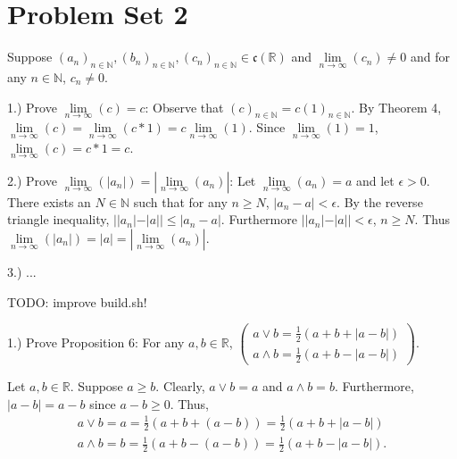 \documentclass{book}
\newcommand{\setbackgroundcolour}{\pagecolor[rgb]{0.2,0.2,0.2}}
\newcommand{\settextcolour}{\color[rgb]{0.8,0.8,0.8}}
\newcommand{\invertbackgroundtext}{\setbackgroundcolour\settextcolour}
\begin{document}
\invertbackgroundtext
\setlength{\parindent}{0pt}

\section{Problem Set 2}
Suppose $(a_n)_{n \in \mathbb{N}}, (b_n)_{n \in \mathbb{N}}, (c_n)_{n \in \mathbb{N}} \in \mathfrak{c}(\mathbb{R})$ and $\lim \limits_{n \to \infty}{}(c_n) \neq 0$ and for any $n \in \mathbb{N}$, $c_n \neq 0$.

1.) Prove $\lim \limits_{n \to \infty}{}(c) = c$:
Observe that $(c)_{n \in \mathbb{N}} = c (1)_{n \in \mathbb{N}}$. By Theorem 4, $\lim \limits_{n \to \infty}{}(c) = \lim \limits_{n \to \infty}{}(c * 1) = c \lim \limits_{n \to \infty}{}(1)$. Since $\lim \limits_{n \to \infty}{}(1) = 1$, $\lim \limits_{n \to \infty}{}(c) = c * 1 = c$.

2.) Prove $\lim \limits_{n \to \infty}{}(|a_n|) = |\lim \limits_{n \to \infty}{}(a_n)|$:
Let $\lim \limits_{n \to \infty}{}(a_n) = a$ and let $\epsilon > 0$. There exists an $N \in \mathbb{N}$ such that for any $n \geq N$, $|a_n - a| < \epsilon$. By the reverse triangle inequality, $||a_n| - |a|| \leq |a_n - a|$. Furthermore $||a_n| - |a|| < \epsilon$, $n \geq N$. Thus $\lim \limits_{n \to \infty}{}(|a_n|) = |a| = |\lim \limits_{n \to \infty}{}(a_n)|$.

3.) ...

TODO: improve build.sh!

\newpage

1.) Prove Proposition 6: For any $a, b \in \mathbb{R}$,
$\left(\begin{array}{ll}
    a \lor b = \frac{1}{2}(a + b + |a - b|)
\\  a \land b = \frac{1}{2}(a + b - |a - b|)
\end{array}\right)$.

Let $a, b \in \mathbb{R}$. Suppose $a \geq b$. Clearly, $a \lor b = a$ and $a \land b = b$. Furthermore, $|a - b| = a - b$ since $a - b \geq 0$. Thus, 
\begin{align}
    a \lor b = a = \frac{1}{2}(a + b + (a - b)) = \frac{1}{2}(a + b + |a - b|)
\\  a \land b = b = \frac{1}{2}(a + b - (a - b)) = \frac{1}{2}(a + b - |a - b|).
\end{align}
\end{document}
